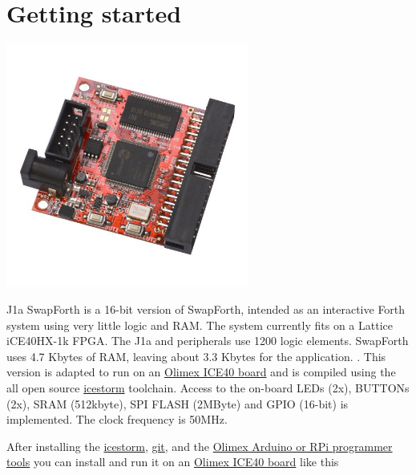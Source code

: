 \endgroup

\thispagestyle{empty}
\pagestyle{headings}

\tableofcontents

\chapter{Getting started}

\begin{center}
\includegraphics[width=0.6\textwidth]{iCE40HX1K-EVB-1.jpg}
\end{center}

J1a SwapForth is a 16-bit version of SwapForth,
intended as an interactive Forth system using very little logic and RAM.
The system currently fits on a Lattice iCE40HX-1k FPGA. 
The J1a and peripherals use 1200 logic elements.
SwapForth uses 4.7 Kbytes of RAM,
leaving about 3.3 Kbytes for the application. . This version is adapted to run on an \href{https://www.olimex.com/Products/FPGA/iCE40/iCE40HX1K-EVB/open-source-hardware}{Olimex ICE40 board} and is compiled using the all open source \href{http://www.clifford.at/icestorm/}{icestorm} toolchain. Access to the on-board LEDs (2x), BUTTONs (2x), SRAM (512kbyte), SPI FLASH (2MByte) and GPIO (16-bit) is implemented. The clock frequency is 50MHz.   

\newpage
After installing the \href{http://www.clifford.at/icestorm/}{icestorm}, \href{https://gist.github.com/derhuerst/1b15ff4652a867391f03}{git}, and the \href{https://www.olimex.com/wiki/ICE40HX1K-EVB#Get_started_under_Linux}{Olimex Arduino or RPi programmer tools} you can install and run it on an
\href{https://www.olimex.com/Products/FPGA/iCE40/iCE40HX1K-EVB/open-source-hardware}{Olimex ICE40 board} 
like this


